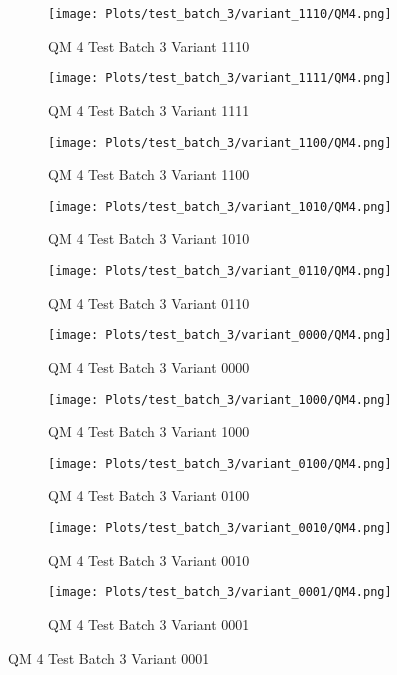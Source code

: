 \documentclass{DissertateFigs}
\begin{document}
\begin{figure}[t!]
    \begin{subfigure}{0.47\textwidth}
    \texttt{[image: Plots/test\_batch\_3/variant\_1110/QM4.png]}
    \caption{QM 4 Test Batch 3 Variant 1110}
    \end{subfigure}
    \begin{subfigure}{0.47\textwidth}
    \texttt{[image: Plots/test\_batch\_3/variant\_1111/QM4.png]}
    \caption{QM 4 Test Batch 3 Variant 1111}
    \end{subfigure}

\medskip

    \begin{subfigure}{0.47\textwidth}
    \texttt{[image: Plots/test\_batch\_3/variant\_1100/QM4.png]}
    \caption{QM 4 Test Batch 3 Variant 1100}
    \end{subfigure}
    \begin{subfigure}{0.47\textwidth}
    \texttt{[image: Plots/test\_batch\_3/variant\_1010/QM4.png]}
    \caption{QM 4 Test Batch 3 Variant 1010}
    \end{subfigure}

\medskip

    \begin{subfigure}{0.47\textwidth}
    \texttt{[image: Plots/test\_batch\_3/variant\_0110/QM4.png]}
    \caption{QM 4 Test Batch 3 Variant 0110}
    \end{subfigure}
    \begin{subfigure}{0.47\textwidth}
    \texttt{[image: Plots/test\_batch\_3/variant\_0000/QM4.png]}
    \caption{QM 4 Test Batch 3 Variant 0000}
    \end{subfigure}

\medskip

    \begin{subfigure}{0.47\textwidth}
    \texttt{[image: Plots/test\_batch\_3/variant\_1000/QM4.png]}
    \caption{QM 4 Test Batch 3 Variant 1000}
    \end{subfigure}
    \begin{subfigure}{0.47\textwidth}
    \texttt{[image: Plots/test\_batch\_3/variant\_0100/QM4.png]}
    \caption{QM 4 Test Batch 3 Variant 0100}
    \end{subfigure}

\medskip

    \begin{subfigure}{0.47\textwidth}
    \texttt{[image: Plots/test\_batch\_3/variant\_0010/QM4.png]}
    \caption{QM 4 Test Batch 3 Variant 0010}
    \end{subfigure}
    \begin{subfigure}{0.47\textwidth}
    \texttt{[image: Plots/test\_batch\_3/variant\_0001/QM4.png]}
    \caption{QM 4 Test Batch 3 Variant 0001}
    \end{subfigure}


\end{figure}
\end{document}
